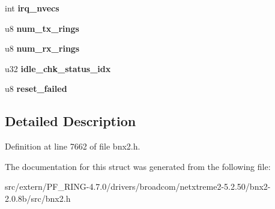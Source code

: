 \begin{DoxyCompactItemize}
\item 
\hypertarget{structbnx2_acd0b6e5101cd331053e0a8ca23c491e2}{
int {\bfseries irq\_\-nvecs}}
\label{structbnx2_acd0b6e5101cd331053e0a8ca23c491e2}

\item 
\hypertarget{structbnx2_a1ba33cb9fb5cbc932a7a05116b35a7ab}{
u8 {\bfseries num\_\-tx\_\-rings}}
\label{structbnx2_a1ba33cb9fb5cbc932a7a05116b35a7ab}

\item 
\hypertarget{structbnx2_afd4c36e89edbaf1a344a490b7e930b36}{
u8 {\bfseries num\_\-rx\_\-rings}}
\label{structbnx2_afd4c36e89edbaf1a344a490b7e930b36}

\item 
\hypertarget{structbnx2_af1eae67a4e42ac867c923527c03ea70c}{
u32 {\bfseries idle\_\-chk\_\-status\_\-idx}}
\label{structbnx2_af1eae67a4e42ac867c923527c03ea70c}

\item 
\hypertarget{structbnx2_a1334c3bc72ffa988714d481bf0e8a682}{
u8 {\bfseries reset\_\-failed}}
\label{structbnx2_a1334c3bc72ffa988714d481bf0e8a682}

\end{DoxyCompactItemize}


\subsection{Detailed Description}


Definition at line 7662 of file bnx2.h.



The documentation for this struct was generated from the following file:\begin{DoxyCompactItemize}
\item 
src/extern/PF\_\-RING-\/4.7.0/drivers/broadcom/netxtreme2-\/5.2.50/bnx2-\/2.0.8b/src/bnx2.h\end{DoxyCompactItemize}
